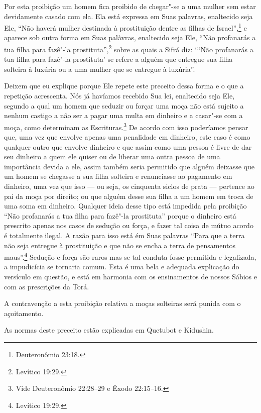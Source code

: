 \begin{multicols}{2}
Por esta proibição um homem fica proibido de chegar"-se a uma mulher sem
estar devidamente casado com ela. Ela está expressa em Suas palavras,
enaltecido seja Ele, ``Não haverá mulher destinada à prostituição dentre
as filhas de Israel'',\footnote{Deuteronômio 23:18.} e aparece sob outra forma
em Suas palàvras, enaltecido seja Ele, ``Não profanarás a tua filha
para fazê"-la prostituta'',\footnote{Levítico 19:29.} sobre as quais a Sifrá\starr{} diz:
```Não profanarás a tua filha para fazê"-la prostituta' se refere a
alguém que entregue sua filha solteira à luxúria ou a uma mulher que se
entregue à luxúria''.

Deixem que eu explique porque Ele repete este preceito dessa forma e o
que a repetição acrescenta. Nós já havíamos recebido Sua lei, enaltecido
seja Ele, segundo a qual um homem que seduzir ou forçar uma moça não
está sujeito a nenhum castigo a não ser a pagar uma multa em dinheiro e
a casar"-se com a moça, como determinam as
Escrituras.\footnote{Vide Deuteronômio 22:28--29 e Êxodo 22:15--16.} De acordo com isso poderíamos pensar
que, uma vez que envolve apenas uma penalidade em dinheiro, este caso é
como qualquer outro que envolve dinheiro e que assim como uma pessoa é
livre de dar seu dinheiro a quem ele quiser ou de liberar uma outra
pessoa de uma importância devida a ele, assim também seria permitido que
alguém deixasse que um homem se chegasse a sua filha solteira e
renunciasse ao pagamento em dinheiro, uma vez que isso --- ou seja, os
cinquenta siclos de prata --- pertence ao pai da moça por direito; ou
que alguém desse sua filha a um homem em troca de uma soma em dinheiro.
Qualquer ideia desse tipo está impedida pela proibição ``Não profanarás
a tua filha para fazê"-la prostituta'' porque o dinheiro está prescrito
apenas nos casos de sedução ou força, e fazer tal coisa de mútuo acordo
é totalmente ilegal. A razão para isso está ém Suas palavras ``Para que
a terra não seja entregue à prostituição e que não se encha a terra de
pensamentos maus''.\footnote{Levítico 19:29.} Sedução e força são raros mas se
tal conduta fosse permitida e legalizada, a impudicícia se tornaria
comum. Esta é uma bela e adequada explicação do versículo em questão, e
está em harmonia com os ensinamentos de nossos Sábios e com as
prescrições da Torá\starr.

A contravenção a esta proibição relativa a moças solteiras será punida
com o açoitamento.

As normas deste preceito estão explicadas em Quetubot\starr{} e Kidushin\starr.


\end{multicols}
